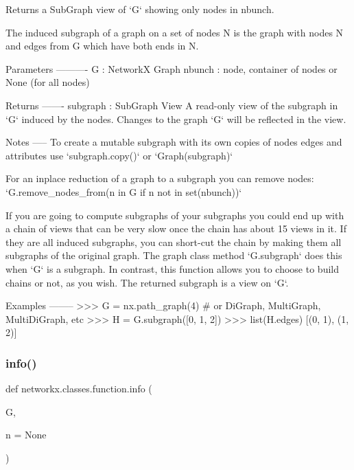 \begin{DoxyVerb}Returns a SubGraph view of `G` showing only nodes in nbunch.

The induced subgraph of a graph on a set of nodes N is the
graph with nodes N and edges from G which have both ends in N.

Parameters
----------
G : NetworkX Graph
nbunch : node, container of nodes or None (for all nodes)

Returns
-------
subgraph : SubGraph View
    A read-only view of the subgraph in `G` induced by the nodes.
    Changes to the graph `G` will be reflected in the view.

Notes
-----
To create a mutable subgraph with its own copies of nodes
edges and attributes use `subgraph.copy()` or `Graph(subgraph)`

For an inplace reduction of a graph to a subgraph you can remove nodes:
`G.remove_nodes_from(n in G if n not in set(nbunch))`

If you are going to compute subgraphs of your subgraphs you could
end up with a chain of views that can be very slow once the chain
has about 15 views in it. If they are all induced subgraphs, you
can short-cut the chain by making them all subgraphs of the original
graph. The graph class method `G.subgraph` does this when `G` is
a subgraph. In contrast, this function allows you to choose to build
chains or not, as you wish. The returned subgraph is a view on `G`.

Examples
--------
>>> G = nx.path_graph(4)  # or DiGraph, MultiGraph, MultiDiGraph, etc
>>> H = G.subgraph([0, 1, 2])
>>> list(H.edges)
[(0, 1), (1, 2)]
\end{DoxyVerb}
 \mbox{\label{namespacenetworkx_1_1classes_1_1function_ad844158261f251a2a9706c3f2ac06d0c}} 
\subsubsection{\texorpdfstring{info()}{info()}}
{\footnotesize\ttfamily def networkx.\+classes.\+function.\+info (\begin{DoxyParamCaption}\item[{}]{G,  }\item[{}]{n = {\ttfamily None} }\end{DoxyParamCaption})}

